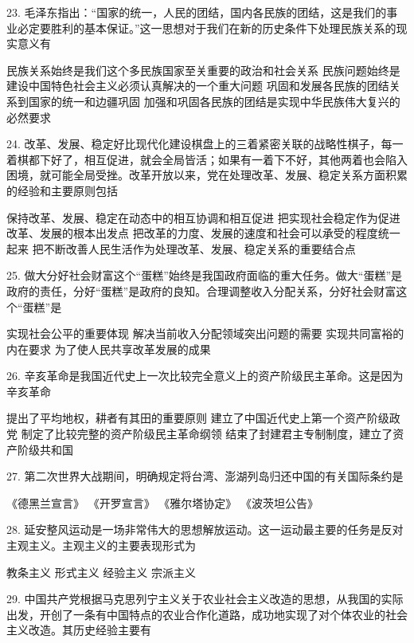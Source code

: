 23. 毛泽东指出：“国家的统一，人民的团结，国内各民族的团结，这是我们的事业必定要胜利的基本保证。”这一思想对于我们在新的历史条件下处理民族关系的现实意义有
\begin{choices}
	 民族关系始终是我们这个多民族国家至关重要的政治和社会关系
	 民族问题始终是建设中国特色社会主义必须认真解决的一个重大问题
	 巩固和发展各民族的团结关系到国家的统一和边疆巩固
	 加强和巩固各民族的团结是实现中华民族伟大复兴的必然要求
\end{choices}
24. 改革、发展、稳定好比现代化建设棋盘上的三着紧密关联的战略性棋子，每一着棋都下好了，相互促进，就会全局皆活；如果有一着下不好，其他两着也会陷入困境，就可能全局受挫。改革开放以来，党在处理改革、发展、稳定关系方面积累的经验和主要原则包括
\begin{choices}
	 保持改革、发展、稳定在动态中的相互协调和相互促进
	 把实现社会稳定作为促进改革、发展的根本出发点
	 把改革的力度、发展的速度和社会可以承受的程度统一起来
	 把不断改善人民生活作为处理改革、发展、稳定关系的重要结合点
\end{choices}
25. 做大分好社会财富这个“蛋糕”始终是我国政府面临的重大任务。做大“蛋糕”是政府的责任，分好“蛋糕”是政府的良知。合理调整收入分配关系，分好社会财富这个“蛋糕”是
\begin{choices}
	 实现社会公平的重要体现
	 解决当前收入分配领域突出问题的需要
	 实现共同富裕的内在要求
	 为了使人民共享改革发展的成果
\end{choices}
26. 辛亥革命是我国近代史上一次比较完全意义上的资产阶级民主革命。这是因为辛亥革命
\begin{choices}
	 提出了平均地权，耕者有其田的重要原则
	 建立了中国近代史上第一个资产阶级政党
	 制定了比较完整的资产阶级民主革命纲领
	 结束了封建君主专制制度，建立了资产阶级共和国
\end{choices}
27. 第二次世界大战期间，明确规定将台湾、澎湖列岛归还中国的有关国际条约是
\begin{choices}
	 《德黑兰宣言》
	 《开罗宣言》
	 《雅尔塔协定》
	 《波茨坦公告》
\end{choices}
28. 延安整风运动是一场非常伟大的思想解放运动。这一运动最主要的任务是反对主观主义。主观主义的主要表现形式为
\begin{choices}
	 教条主义
	 形式主义
	 经验主义
	 宗派主义
\end{choices}
29. 中国共产党根据马克思列宁主义关于农业社会主义改造的思想，从我国的实际出发，开创了一条有中国特点的农业合作化道路，成功地实现了对个体农业的社会主义改造。其历史经验主要有
